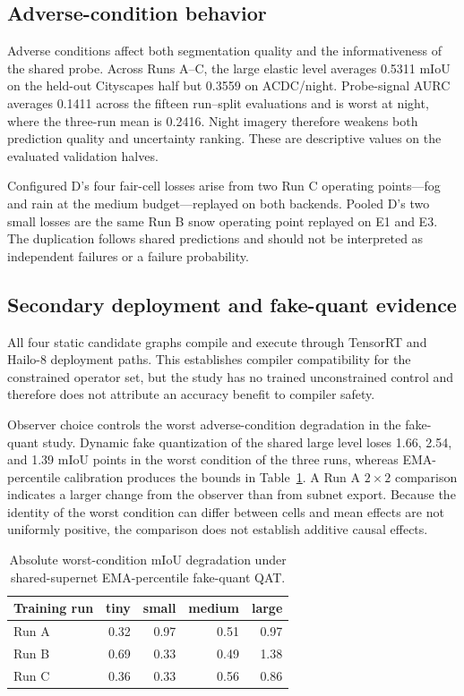 \documentclass[a4paper,review,12pt]{elsarticle}
\newcommand{\miou}{mIoU}
\begin{document}
\subsection{Adverse-condition behavior}

Adverse conditions affect both segmentation quality and the informativeness of the shared probe. Across Runs A--C, the large elastic level averages 0.5311 \miou{} on the held-out Cityscapes half but 0.3559 on ACDC/night. Probe-signal AURC averages 0.1411 across the fifteen run--split evaluations and is worst at night, where the three-run mean is 0.2416. Night imagery therefore weakens both prediction quality and uncertainty ranking. These are descriptive values on the evaluated validation halves.

Configured D's four fair-cell losses arise from two Run C operating points---fog and rain at the medium budget---replayed on both backends. Pooled D's two small losses are the same Run B snow operating point replayed on E1 and E3. The duplication follows shared predictions and should not be interpreted as independent failures or a failure probability.

\subsection{Secondary deployment and fake-quant evidence}
\label{sec:qatresults}

All four static candidate graphs compile and execute through TensorRT and Hailo-8 deployment paths. This establishes compiler compatibility for the constrained operator set, but the study has no trained unconstrained control and therefore does not attribute an accuracy benefit to compiler safety.

Observer choice controls the worst adverse-condition degradation in the fake-quant study. Dynamic fake quantization of the shared large level loses 1.66, 2.54, and 1.39 \miou{} points in the worst condition of the three runs, whereas EMA-percentile calibration produces the bounds in Table~\ref{tab:qat}. A Run A $2\times2$ comparison indicates a larger change from the observer than from subnet export. Because the identity of the worst condition can differ between cells and mean effects are not uniformly positive, the comparison does not establish additive causal effects.

\begin{table}[H]
\centering
\caption{Absolute worst-condition \miou{} degradation under shared-supernet EMA-percentile fake-quant QAT.}
\label{tab:qat}
\begin{tabular}{@{}lrrrr@{}}
\toprule
Training run & tiny & small & medium & large \\
\midrule
Run A & 0.32 & 0.97 & 0.51 & 0.97 \\
Run B & 0.69 & 0.33 & 0.49 & 1.38 \\
Run C & 0.36 & 0.33 & 0.56 & 0.86 \\
\bottomrule
\end{tabular}
\end{table}
\end{document}
